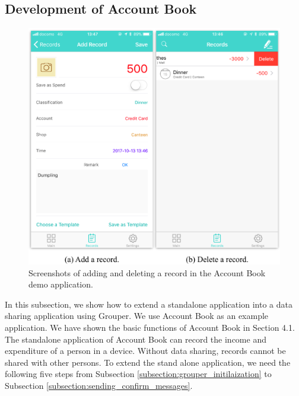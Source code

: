 \documentclass[a4paper,11pt]{report}
\begin{document}
\subsection{Development of Account Book}
\begin{figure}[t]
	\centering
	\includegraphics[scale=0.7]{account_book}
	\caption{Screenshots of adding and deleting a record in the Account Book demo application.}
	\label{fig:add_delete_record}
\end{figure}
In this subsection, we show how to extend a standalone application into a data sharing application using Grouper.
We use Account Book as an example application.
We have shown the basic functions of Account Book in Section 4.1.
The standalone application of Account Book can record the income and expenditure of a person in a device.
Without data sharing, records cannot be shared with other persons.
To extend the stand alone application, we need the following five steps from Subsection \ref{subsection:grouper_initilaization} to Subsection \ref{subsection:sending_confirm_messages}.
\end{document}
